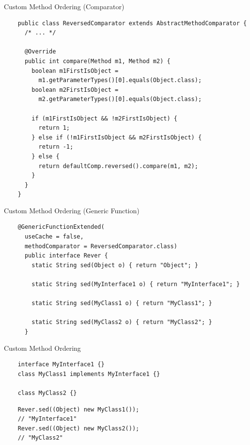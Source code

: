 \documentclass[13pt]{beamer}
\begin{document}
\begin{frame}[fragile]{Custom Method Ordering (Comparator)}
  \begin{verbatim}
    public class ReversedComparator extends AbstractMethodComparator {
      /* ... */

      @Override
      public int compare(Method m1, Method m2) {
        boolean m1FirstIsObject =
          m1.getParameterTypes()[0].equals(Object.class);
        boolean m2FirstIsObject =
          m2.getParameterTypes()[0].equals(Object.class);

        if (m1FirstIsObject && !m2FirstIsObject) {
          return 1;
        } else if (!m1FirstIsObject && m2FirstIsObject) {
          return -1;
        } else {
          return defaultComp.reversed().compare(m1, m2);
        }
      }
    }
  \end{verbatim}
\end{frame}

\begin{frame}[fragile]{Custom Method Ordering (Generic Function)}
  \begin{verbatim}
    @GenericFunctionExtended(
      useCache = false,
      methodComparator = ReversedComparator.class)
      public interface Rever {
        static String sed(Object o) { return "Object"; }
      
        static String sed(MyInterface1 o) { return "MyInterface1"; }
    
        static String sed(MyClass1 o) { return "MyClass1"; }

        static String sed(MyClass2 o) { return "MyClass2"; }
      }
  \end{verbatim}
\end{frame}

\begin{frame}[fragile]{Custom Method Ordering}
  \begin{verbatim}
    interface MyInterface1 {}
    class MyClass1 implements MyInterface1 {}
    
    class MyClass2 {}
  \end{verbatim}

  \vspace{5mm} %

  \begin{verbatim}
    Rever.sed((Object) new MyClass1());
    // "MyInterface1"
    Rever.sed((Object) new MyClass2());
    // "MyClass2"
  \end{verbatim}
\end{frame}
\end{document}

